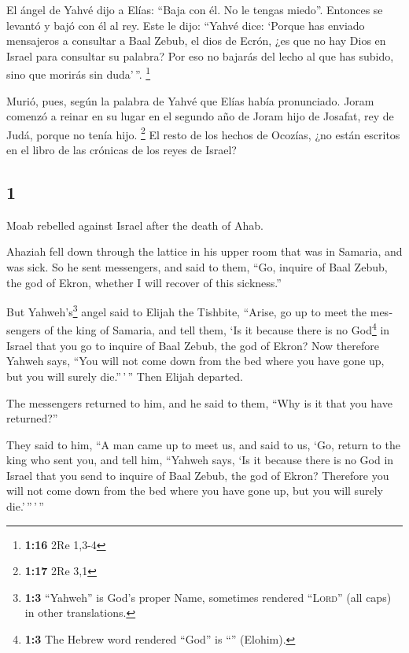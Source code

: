\begin{paracol}{2}
 El ángel de Yahvé dijo a Elías: ``Baja con él. No le
tengas miedo''. Entonces se levantó y bajó con él al rey.
 Este le dijo: ``Yahvé dice: `Porque has enviado
mensajeros a consultar a Baal Zebub, el dios de Ecrón, ¿es que no hay
Dios en Israel para consultar su palabra? Por eso no bajarás del lecho
al que has subido, sino que morirás sin duda'\,''. \footnote{\textbf{1:16}
  2Re 1,3-4}

 Murió, pues, según la palabra de Yahvé que Elías había
pronunciado. Joram comenzó a reinar en su lugar en el segundo año de
Joram hijo de Josafat, rey de Judá, porque no tenía hijo. \footnote{\textbf{1:17}
  2Re 3,1}  El resto de los hechos de Ocozías, ¿no están
escritos en el libro de las crónicas de los reyes de Israel?

\switchcolumn
\begin{otherlanguage}{english}

\hypertarget{section-1}{%
\section{1}\label{section-1}}

 Moab rebelled against Israel after the death of Ahab.

 Ahaziah fell down through the lattice in his upper room
that was in Samaria, and was sick. So he sent messengers, and said to
them, ``Go, inquire of Baal Zebub, the god of Ekron, whether I will
recover of this sickness.''

 But Yahweh's\footnote{\textbf{1:3} ``Yahweh'' is God's
  proper Name, sometimes rendered ``\textsc{Lord}'' (all caps) in other
  translations.} angel said to Elijah the Tishbite, ``Arise, go up to
meet the messengers of the king of Samaria, and tell them, `Is it
because there is no God\footnote{\textbf{1:3} The Hebrew word rendered
  ``God'' is ``'' (Elohim).} in Israel that you go to
inquire of Baal Zebub, the god of Ekron?  Now therefore
Yahweh says, ``You will not come down from the bed where you have gone
up, but you will surely die.''\,'\,'' Then Elijah departed.

 The messengers returned to him, and he said to them,
``Why is it that you have returned?''

 They said to him, ``A man came up to meet us, and said to
us, `Go, return to the king who sent you, and tell him, ``Yahweh says,
`Is it because there is no God in Israel that you send to inquire of
Baal Zebub, the god of Ekron? Therefore you will not come down from the
bed where you have gone up, but you will surely die.'\,''\,'\,''


\end{otherlanguage}
\end{paracol}
